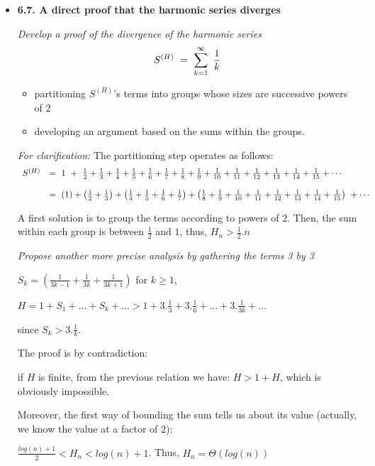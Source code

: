 \begin{itemize}
\item
{\bf 6.7. A direct proof that the harmonic series diverges}

{\em Develop a proof of the divergence of the harmonic series 
\[ S^{(H)} \ = \ \sum_{k=1}^\infty \ {1 \over k} \]
\begin{itemize}
\item
partitioning $S^{(H)}$'s terms into groups whose sizes are successive powers of $2$
\item
developing an argument based on the sums within the groups.
\end{itemize}
}

\smallskip

{\em For clarification:}
The partitioning step operates as follows:
{\footnotesize
\[ 
\begin{array}{ll}
S^{(H)} 
             & = \ 1 \ + \ {1 \over 2} + {1 \over 3} + {1 \over 4} + {1 \over 5} + {1 \over 6}+ {1 \over 7} + {1 \over 8} + {1 \over 9} + {1 \over 10}+ {1 \over 11}  +{1 \over 12} + {1 \over 13} + {1 \over 14}+ {1 \over 15} + \cdots \\
             & \\
  & = \ (1)  +  \left( {1 \over 2} + {1 \over 3} \right)  +  \left( {1 \over 4} + {1 \over 5} + {1 \over 6}+ {1 \over 7} \right)  +  \left( {1 \over 8} + {1 \over 9} + {1 \over 10}+ {1 \over 11}  +{1 \over 12} + {1 \over 13} + {1 \over 14}+ {1 \over 15} \right) \ +\cdots
\end{array} \]
}


A first solution is to group the terms according to powers of $2$. 
Then, the sum within each group is between $\frac{1}{2}$ and $1$, thus,
$H_n > \frac{1}{2}.n$
\medskip

{\em Propose another more precise analysis by gathering the terms 3 by 3}

$S_k = (\frac{1}{3k-1} + \frac{1}{3k} + \frac{1}{3k+1} )$ for $k\geq1$, 

$H = 1 + S_1 + ... + S_k + ... > 1 + 3.\frac{1}{3} + 3.\frac{1}{6} + ... + 3.\frac{1}{3k} + ... $

since $S_k > 3.\frac{1}{k} $.

The proof is by contradiction:

if $H$ is finite, from the previous relation we have: $H > 1 + H$, which is obviously impossible.
\medskip

Moreover, the first way of  bounding the sum tells us about its value (actually, we know the value at a factor of $2$):

$\frac{log(n)+1}{2} < H_n < log(n)+1$. Thus, $H_n = \Theta(log(n))$
\medskip


\end{itemize}
